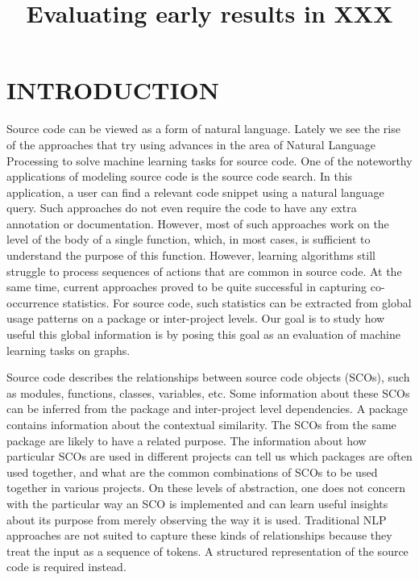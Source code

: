 \documentclass[a4paper,twoside]{article}
\begin{document}
\title{Evaluating early results in XXX}


\keywords{}

\abstract{
}

\onecolumn \maketitle \normalsize \setcounter{footnote}{0} \vfill

\section{\uppercase{Introduction}}
Source code can be viewed as a form of natural language. Lately we see the rise of the approaches that try using advances in the area of Natural Language Processing to solve machine learning tasks for source code. One of the noteworthy applications of modeling source code is the source code search. In this application, a user can find a relevant code snippet using a natural language query. Such approaches do not even require the code to have any extra annotation or documentation. However, most of such approaches work on the level of the body of a single function, which, in most cases, is sufficient to understand the purpose of this function. However, learning algorithms still struggle to process sequences of actions that are common in source code. At the same time, current approaches proved to be quite successful in capturing co-occurrence statistics. For source code, such statistics can be extracted from global usage patterns on a package or inter-project levels. Our goal is to study how useful this global information is by posing this goal as an evaluation of machine learning tasks on graphs.
 
Source code describes the relationships between source code objects (SCOs), such as modules, functions, classes, variables, etc. Some information about these SCOs can be inferred from the package and inter-project level dependencies. A package contains information about the contextual similarity. The SCOs from the same package are likely to have a related purpose. The information about how particular SCOs are used in different projects can tell us which packages are often used together, and what are the common combinations of SCOs to be used together in various projects. On these levels of abstraction, one does not concern with the particular way an SCO is implemented and can learn useful insights about its purpose from merely observing the way it is used. Traditional NLP approaches are not suited to capture these kinds of relationships because they treat the input as a sequence of tokens. A structured representation of the source code is required instead.
\end{document}
